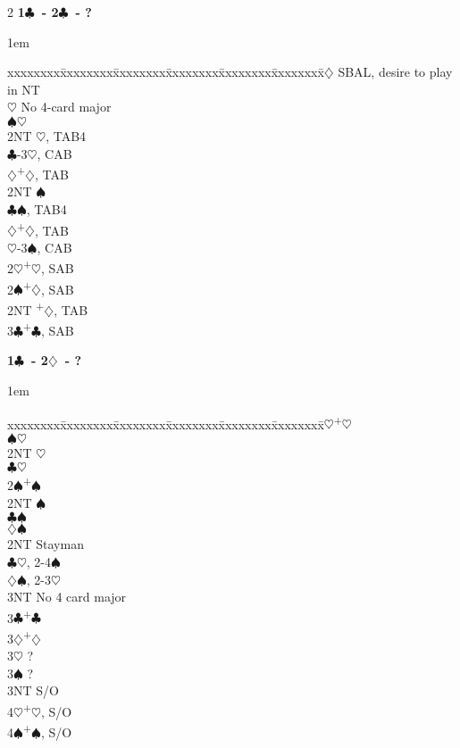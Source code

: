 \documentclass[10pt]{article}
\renewcommand{\c}{$\clubsuit$}
\renewcommand{\d}{$\diamondsuit$}
\newcommand{\h}{$\heartsuit$}
\newcommand{\s}{$\spadesuit$}
\newcommand{\p}{\textsuperscript{+}}
\newenvironment{bidtable}[1][]
{\textbf{#1}
  \begin{adjustwidth}{1em}{}
    \addvspace{2pt}
    \begin{tabbing}
      xxxxxxxx\=xxxxxxxx\=xxxxxxxx\=xxxxxxxx\=xxxxxxxx\=xxxxxxxx\=\kill}
{\end{tabbing}\end{adjustwidth}\bigskip}%
\begin{document}
\begin{multicols*}{2}
\begin{bidtable}[1\c\ - 2\c\ - ?]
2\d \> SBAL, desire to play in NT \\
    \h \> No 4-card major     \\
    \s {}\h                 \\
    \>     \> 2NT \h, TAB4    \\
    \>     \c {}-3\h, CAB   \\
    \>     \d {}\p\d, TAB   \\
    \> 2NT \s                 \\
    \>     \c {}\s, TAB4    \\
    \>     \d {}\p\d, TAB   \\
    \>     \h {}-3\s, CAB   \\
2\h {}\p\h, SAB                 \\
2\s {}\p\d, SAB                 \\
2NT \p\d, TAB                 \\
3\c {}\p\c, SAB
\end{bidtable}

\begin{bidtable}[1\c\ - 2\d\ - ?]
2\h {}\p\h                  \\
    \s {}\h             \\
    \> 2NT \h             \\
    \c {}\h             \\
2\s {}\p\s                  \\
    \> 2NT \s             \\
    \c {}\s             \\
    \d {}\s             \\
2NT \> Stayman                \\
    \c {}\h, 2-4\s      \\
    \d {}\s, 2-3\h      \\
    \> 3NT \> No 4 card major \\
3\c {}\p\c                  \\
3\d {}\p\d                  \\
3\h \> ?                      \\
3\s \> ?                      \\
3NT \> S/O                    \\
4\h {}\p\h, S/O             \\
4\s {}\p\s, S/O
\end{bidtable}


\end{multicols*}
\end{document}
